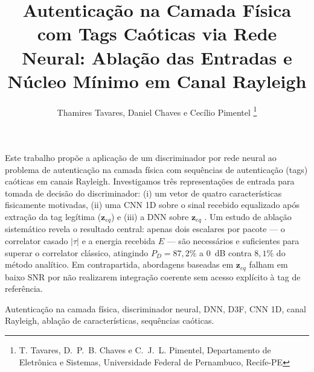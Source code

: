 \documentclass{sbrt}
\begin{document}
\title{Autenticação na Camada Física com Tags Caóticas via Rede Neural: Ablação das Entradas e Núcleo Mínimo em Canal Rayleigh}

\author{Thamires Tavares, Daniel Chaves e Cecílio Pimentel
\thanks{T. Tavares, D.~P.~B. Chaves e C.~J.~L. Pimentel, Departamento de Eletrônica e Sistemas, Universidade Federal de Pernambuco, Recife-PE}%
}


\maketitle



\begin{resumo}
Este trabalho propõe a aplicação de um discriminador por rede neural ao problema de autenticação na camada física com sequências de autenticação (tags) caóticas em canais Rayleigh. Investigamos três representações de entrada para tomada de decisão do discriminador: (i) um vetor de quatro características fisicamente motivadas, (ii) uma CNN 1D sobre o sinal recebido equalizado após extração da tag legítima ($\mathbf{z}_{eq}$) e (iii) a DNN sobre $\mathbf{z}_{eq}$ . 
Um estudo de ablação sistemático revela o resultado central: apenas dois escalares por pacote — o correlator casado $|\tau|$ e a energia recebida $E$ — são necessários e suficientes para superar o correlator clássico, atingindo $P_D = 87{,}2\%$ a 0~dB contra $8{,}1\%$ do método analítico. Em contrapartida, abordagens baseadas em $\mathbf{z}_{eq}$ falham em baixo SNR por não realizarem integração coerente sem acesso explícito à tag de referência. 
\end{resumo}

\begin{chave}
Autenticação na camada física, discriminador neural, DNN, D3F, CNN 1D, canal Rayleigh, ablação de características, sequências caóticas.
\end{chave}
\end{document}
